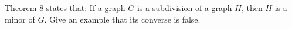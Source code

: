 \question Theorem 8 states that: If a graph \(G\) is a subdivision of a graph \(H\), then \(H\) is a minor of \(G\). Give an example that its converse is false.
